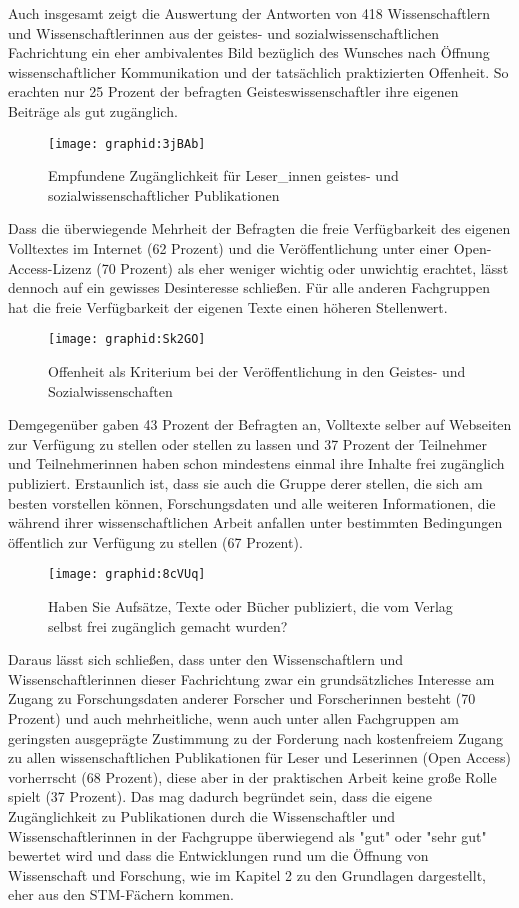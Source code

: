 Auch insgesamt zeigt die Auswertung der Antworten von 418 Wissenschaftlern und Wissenschaftlerinnen aus der geistes- und sozialwissenschaftlichen Fachrichtung ein eher ambivalentes Bild bezüglich des Wunsches nach Öffnung wissenschaftlicher Kommunikation und der tatsächlich praktizierten Offenheit. So erachten nur 25 Prozent der befragten Geisteswissenschaftler ihre eigenen Beiträge als gut zugänglich.

\begin{figure}[h!]
\texttt{[image: graphid:3jBAb]}
\caption{Empfundene Zugänglichkeit für Leser_innen geistes- und sozialwissenschaftlicher Publikationen}
\end{figure}

Dass die überwiegende Mehrheit der Befragten die freie Verfügbarkeit des eigenen Volltextes im Internet (62 Prozent) und die Veröffentlichung unter einer Open-Access-Lizenz (70 Prozent) als eher weniger wichtig oder unwichtig erachtet, lässt dennoch auf ein gewisses Desinteresse schließen. Für alle anderen Fachgruppen hat die freie Verfügbarkeit der eigenen Texte einen höheren Stellenwert.

\begin{figure}[h!]
\texttt{[image: graphid:Sk2GO]}
\caption{Offenheit als Kriterium bei der Veröffentlichung in den Geistes- und Sozialwissenschaften}
\end{figure}

Demgegenüber gaben 43 Prozent der Befragten an, Volltexte selber auf Webseiten zur Verfügung zu stellen oder stellen zu lassen und 37 Prozent der Teilnehmer und Teilnehmerinnen haben schon mindestens einmal ihre Inhalte frei zugänglich publiziert. Erstaunlich ist, dass sie auch die Gruppe derer stellen, die sich am besten vorstellen können, Forschungsdaten und alle weiteren Informationen, die während ihrer wissenschaftlichen Arbeit anfallen unter bestimmten Bedingungen öffentlich zur Verfügung zu stellen (67 Prozent).

\begin{figure}[h!]
\texttt{[image: graphid:8cVUq]}
\caption{Haben Sie Aufsätze, Texte oder Bücher publiziert, die vom Verlag selbst frei zugänglich gemacht wurden?}
\end{figure}

Daraus lässt sich schließen, dass unter den Wissenschaftlern und Wissenschaftlerinnen dieser Fachrichtung zwar ein grundsätzliches Interesse am Zugang zu Forschungsdaten anderer Forscher und Forscherinnen besteht (70 Prozent) und auch mehrheitliche, wenn auch unter allen Fachgruppen am geringsten ausgeprägte Zustimmung zu der Forderung nach kostenfreiem Zugang zu allen wissenschaftlichen Publikationen für Leser und Leserinnen (Open Access) vorherrscht (68 Prozent), diese aber in der praktischen Arbeit keine große Rolle spielt (37 Prozent). Das mag dadurch begründet sein, dass die eigene Zugänglichkeit zu Publikationen durch die Wissenschaftler und Wissenschaftlerinnen in der Fachgruppe überwiegend als "gut" oder "sehr gut" bewertet wird und dass die Entwicklungen rund um die Öffnung von Wissenschaft und Forschung, wie im Kapitel 2 zu den Grundlagen dargestellt, eher aus den STM-Fächern kommen.

